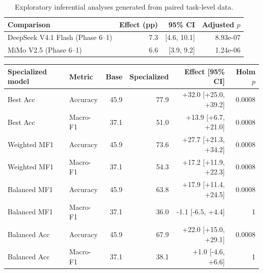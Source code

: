 \begin{table}[htbp]
\centering
\caption{Exploratory inferential analyses generated from paired task-level data.}
\label{tab:statistical_summary}
\begin{tabular}{lrrr}
\toprule
Comparison & Effect (pp) & 95\% CI & Adjusted $p$ \\
\midrule
DeepSeek V4.1 Flash (Phase 6--1) & 7.3 & [4.6, 10.1] & 8.93e-07 \\
MiMo V2.5 (Phase 6--1) & 6.6 & [3.9, 9.2] & 1.24e-06 \\
\bottomrule
\end{tabular}
\end{table}


\begin{table}[htbp]
\centering
\begin{tabular}{llrrrr}
\toprule
Specialized model & Metric & Base & Specialized & Effect [95\% CI] & Holm $p$ \\
\midrule
Best Acc & Accuracy & 45.9 & 77.9 & +32.0 [+25.0, +39.2] & 0.0008 \\
Best Acc & Macro-F1 & 37.1 & 51.0 & +13.9 [+6.7, +21.0] & 0.0008 \\
Weighted MF1 & Accuracy & 45.9 & 73.6 & +27.7 [+21.3, +34.2] & 0.0008 \\
Weighted MF1 & Macro-F1 & 37.1 & 54.3 & +17.2 [+11.9, +22.3] & 0.0008 \\
Balanced MF1 & Accuracy & 45.9 & 63.8 & +17.9 [+11.4, +24.5] & 0.0008 \\
Balanced MF1 & Macro-F1 & 37.1 & 36.0 & -1.1 [-6.5, +4.4] & 1 \\
Balanced Acc & Accuracy & 45.9 & 67.9 & +22.0 [+15.0, +29.1] & 0.0008 \\
Balanced Acc & Macro-F1 & 37.1 & 38.1 & +1.0 [-4.6, +6.6] & 1 \\
\bottomrule
\end{tabular}
\end{table}

